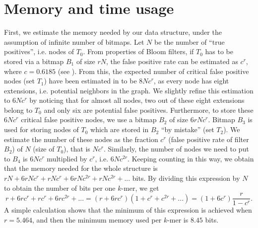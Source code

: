 \documentclass[pdftex]{llncs}\usepackage[T1]{fontenc}
\begin{document}
\section{Memory and time usage} \label{sec:memory_time}

First, we estimate the memory needed by our data structure, under the assumption of infinite number of bitmaps. Let $N$ be the number of ``true positives'', i.e. nodes of $T_0$. From properties of Bloom filters, if $T_0$ has to be stored via a bitmap $B_1$ of size $rN$, the false positive rate can be estimated as $c^r$, where $c=0.6185$ (see \cite{Kirsch:2008:LHS:1400123.1400125}). From this, the expected number of critical false positive nodes (set $T_1$) have been estimated in \cite{DBLP:conf/wabi/ChikhiR12} to be $8Nc^r$, as every node has eight extensions, i.e. potential neighbors in the graph. We slightly refine this estimation to $6Nc^r$ by noticing that for almost all nodes, two out of these eight extensions belong to $T_0$ and only six are potential false positives.
Furthermore, to store these $6Nc^r$ critical false positive nodes, we use a bitmap $B_2$ of size $6rNc^r$. Bitmap $B_3$ is used for storing nodes of $T_0$ which are stored in $B_2$ ``by mistake'' (set $T_2$).
We estimate the number of these nodes as the fraction $c^r$ (false positive rate of filter $B_2$) of $N$ (size of $T_0$), that is $Nc^r$.
Similarly, the number of nodes we need to put to $B_4$  is $6Nc^r$
multiplied by $c^r$, i.e. $6Nc^{2r}$. Keeping counting in this way, we
obtain that the memory needed for the whole structure is $rN + 6rNc^r
+ rNc^r+ 6rNc^{2r} + rNc^{2r} + ...$ bits. By dividing this expression
by $N$ to obtain the number of bits per one $k$-mer, we get 
\begin{equation}r + 6rc^r + rc^r + 6rc^{2r} + ... = (r+6rc^r )(1 + c^r + c^{2r}+...)= (1+6c^r) \frac{r}{1-c^r}.\label{formula}\end{equation} A simple calculation shows that the minimum of this expression is achieved when $r = 5.464$, and then the minimum memory used per $k$-mer is $8.45$ bits.
\end{document}
